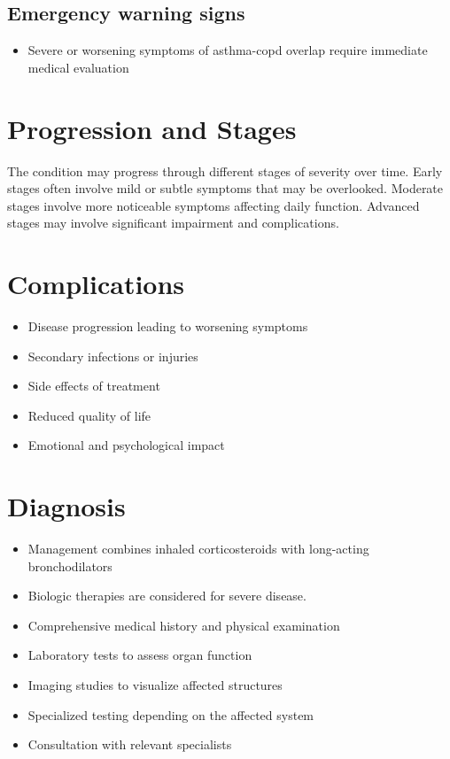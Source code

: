 \subsection{Emergency warning signs}
\begin{itemize}[noitemsep]
  \item Severe or worsening symptoms of asthma-copd overlap require immediate medical evaluation
\end{itemize}
\section{Progression and Stages}
The condition may progress through different stages of severity over time. Early stages often involve mild or subtle symptoms that may be overlooked. Moderate stages involve more noticeable symptoms affecting daily function. Advanced stages may involve significant impairment and complications.
\section{Complications}
\begin{itemize}[noitemsep]
  \item Disease progression leading to worsening symptoms
  \item Secondary infections or injuries
  \item Side effects of treatment
  \item Reduced quality of life
  \item Emotional and psychological impact
\end{itemize}
\section{Diagnosis}
\begin{itemize}[noitemsep]
  \item Management combines inhaled corticosteroids with long-acting bronchodilators
  \item Biologic therapies are considered for severe disease.
  \item Comprehensive medical history and physical examination
  \item Laboratory tests to assess organ function
  \item Imaging studies to visualize affected structures
  \item Specialized testing depending on the affected system
  \item Consultation with relevant specialists
\end{itemize}
